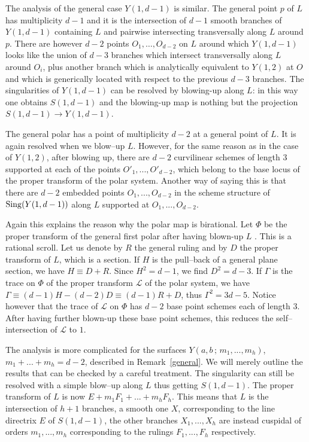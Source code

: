 \documentclass[11pt]{article}   %
\theoremstyle{definition}
\numberwithin{Theorem}{section} \numberwithin{equation}{section}
\renewcommand{\L}{{\mathcal L}}
\begin{document}
{The analysis of the general case $Y(1,d-1)$ is similar. The general
point $p$ of $L$ has multiplicity $d-1$ and it is the intersection
of $d-1$ smooth branches of $Y(1,d-1)$ containing $L$ and pairwise
intersecting transversally along $L$ around $p$. There are however
$d-2$ points $O_1,\ldots, O_{d-2}$ on $L$ around which $Y(1,d-1)$
looks like the union of $d-3$ branches which intersect transversally
along $L$ around $O_i$, plus another branch which is analytically
equivalent to $Y(1,2)$ at $O$ and which is generically located with
respect to the previous $d-3$ branches. The singularities of
$Y(1,d-1)$ can be resolved by blowing-up along $L$: in this way one
obtains $S(1,d-1)$ and the blowing-up map is nothing but the
projection $S(1,d-1)\to Y(1,d-1)$.

The general polar has a point of multiplicity $d-2$ at a general
point of $L$. It is again resolved when we blow--up $L$. However,
for the same reason as in the case of $Y(1,2)$, after blowing up,
there are $d-2$ curvilinear schemes of length $3$ supported at each
of the points $O'_1,...,O'_{d-2}$, which belong to the base locus of
the proper transform of the polar system. Another way of saying this
is that there are $d-2$ embedded points $O_1,...,O_{d-2}$ in the
scheme structure of ${\rm Sing}(Y(1,d-1))$ along $L$ supported at
$O_1,...,O_{d-2}$.

Again this explains the reason why the polar map is birational. Let
$\Phi$ be the proper transform of the general first polar after
having blown-up $L$ . This is a rational scroll. Let us denote by
$R$ the general ruling and by $D$ the proper transform of $L$, which
is a section. If $H$ is the pull--back of a general plane section,
we have $H\equiv D+R$. Since $H^ 2=d-1$, we find $D^ 2=d-3$. If
$\Gamma$ is the trace on $\Phi$ of the proper transform $\L$ of the
polar system, we have $\Gamma\equiv (d-1)H-(d-2)D\equiv (d-1)R+D$,
thus $\Gamma^ 2=3d-5$. Notice however that the trace of $\L$ on
$\Phi$ has $d-2$ base point schemes each of length $3$. After having
further blown-up these base point schemes, this reduces the
self--intersection of $\L$ to $1$.

The analysis is more complicated for the surfaces
$Y(a,b\,;\,m_1,...,m_h)$, $m_1+...+m_h=d-2$,  described in
Remark~\ref{general}. We will merely outline the results that can be
checked by a careful treatment. The singularity  can still
be resolved with a simple blow--up along $L$ thus getting
$S(1,d-1)$. The proper transform of $L$ is now
$E+m_1F_1+...+m_hF_h$. This means that $L$ is the intersection of
$h+1$ branches, a smooth one $X$, corresponding to the line
directrix $E$ of $S(1,d-1)$, the other branches $X_1,...,X_h$ are
instead cuspidal of orders $m_1,...,m_h$ corresponding to the
rulings $F_1,...,F_h$ respectively.

}
\end{document}
